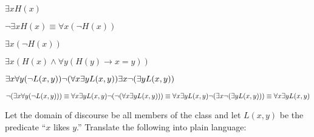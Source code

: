 \documentclass[]{exam}
\begin{document}
\begin{questions}
      \begin{solution}
        \begin{enumerate}
          \begin{minipage}{.45\textwidth}
            \item $\exists x H(x)$
            \item $\lnot \exists x H(x) \equiv \forall x (\lnot H(x))$
            \item $\exists x (\lnot H(x))$
            \item $\exists x (H(x) \wedge \forall y (H(y) \rightarrow x = y))$
          \end{minipage}
          \begin{minipage}{.45\textwidth}
            \item $\exists x \forall y(\lnot L(x,y))\\
              \lnot(\forall x \exists y L(x,y))\\
              \exists x \lnot (\exists y L(x,y))$
            \item $\lnot (\exists x \forall y(\lnot L(x,y))) \equiv \forall x
              \exists y L(x,y)\\
              \lnot(\lnot(\forall x \exists y L(x,y))) \equiv \forall x \exists
              y L(x,y)\\
              \lnot(\exists x \lnot (\exists y L(x,y))) \equiv \forall x \exists
              y L(x,y)$
          \end{minipage}
        \end{enumerate}
      \end{solution}

    \newpage

    \question Let the domain of discourse be all members of the class and let
      $L(x,y)$ be the predicate ``$x$ likes $y$.'' Translate the following
      into plain language:



\end{questions}
\end{document}
